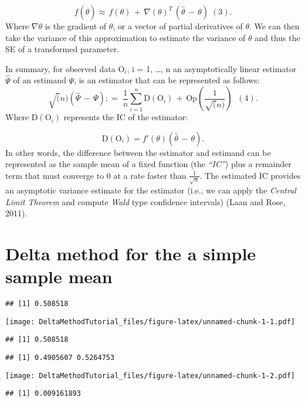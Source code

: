 \documentclass[
]{article}
\begin{document}
\[f(\hat\theta) \approx\, f(\theta) \,+\,\nabla(\theta)^T\,(\hat\theta\,-\,\theta)\; (3).\]
Where \(\nabla \theta\) is the gradient of \(\theta\), or a vector of
partial derivatives of \(\theta\). We can then take the variance of this
approximation to estimate the variance of \(\theta\) and thus the SE of
a transformed parameter.

In summary, for observed data \(\text{O}_i\), i = 1, \ldots, n an
asymptotically linear estimator \(\hat\Psi\) of an estimand \(\Psi\), is
an estimator that can be represented as follows:
\[\sqrt(n)(\hat\Psi\,-\,\Psi);=\;\frac{1}{n}\sum_{i=1}^n \text{D}(\text{O}_{i})\,+\,\text{Op}(\frac{1}{\sqrt(n)})\;\;(4).\]
Where \(\text{D}(\text{O}_{i})\) represents the IC of the estimator:

\[\text{D}(\text{O}_{i})=f'(\theta)(\hat\theta\,-\,\theta).\] In other
words, the difference between the estimator and estimand can be
represented as the sample mean of a fixed function (the \emph{``IC''})
plus a remainder term that must converge to 0 at a rate faster than
\(\frac{1}{\sqrt{n}}\). The estimated IC provides an asymptotic variance
estimate for the estimator (i.e., we can apply the \emph{Central Limit
Theorem} and compute \emph{Wald} type confidence intervals) (Laan and
Rose, 2011).

\hypertarget{delta-method-for-the-a-simple-sample-mean}{%
\section{Delta method for the a simple sample
mean}\label{delta-method-for-the-a-simple-sample-mean}}

\begin{verbatim}
## [1] 0.508518
\end{verbatim}

\texttt{[image: DeltaMethodTutorial\_files/figure-latex/unnamed-chunk-1-1.pdf]}

\begin{verbatim}
## [1] 0.508518
\end{verbatim}

\begin{verbatim}
## [1] 0.4905607 0.5264753
\end{verbatim}

\texttt{[image: DeltaMethodTutorial\_files/figure-latex/unnamed-chunk-1-2.pdf]}

\begin{verbatim}
## [1] 0.009161893
\end{verbatim}
\end{document}
